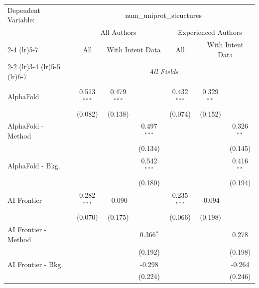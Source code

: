 \begingroup
\centering
\begin{tabular}{lcccccc}
   \tabularnewline \midrule \midrule
   Dependent Variable: & \multicolumn{6}{c}{num\_uniprot\_structures}\\
 & \multicolumn{3}{c}{All Authors} & \multicolumn{3}{c}{Experienced Authors} \\
\cmidrule(lr){2-4} \cmidrule(lr){5-7}
 & \multicolumn{1}{c}{All} & \multicolumn{2}{c}{With Intent Data} & \multicolumn{1}{c}{All} & \multicolumn{2}{c}{With Intent Data} \\
\cmidrule(lr){2-2} \cmidrule(lr){3-4} \cmidrule(lr){5-5} \cmidrule(lr){6-7}
 & \multicolumn{6}{c}{\textit{All Fields}} \\ \\
   AlphaFold            & 0.513$^{***}$ & 0.479$^{***}$ &               & 0.432$^{***}$ & 0.329$^{**}$ &   \\   
                        & (0.082)       & (0.138)       &               & (0.074)       & (0.152)      &   \\   
   AlphaFold - Method   &               &               & 0.497$^{***}$ &               &              & 0.326$^{**}$\\   
                        &               &               & (0.134)       &               &              & (0.145)\\   
   AlphaFold - Bkg.     &               &               & 0.542$^{***}$ &               &              & 0.416$^{**}$\\   
                        &               &               & (0.180)       &               &              & (0.194)\\   
   AI Frontier          & 0.282$^{***}$ & -0.090        &               & 0.235$^{***}$ & -0.094       &   \\   
                        & (0.070)       & (0.175)       &               & (0.066)       & (0.198)      &   \\   
   AI Frontier - Method &               &               & 0.366$^{*}$   &               &              & 0.278\\   
                        &               &               & (0.192)       &               &              & (0.198)\\   
   AI Frontier - Bkg.   &               &               & -0.298        &               &              & -0.264\\   
                        &               &               & (0.224)       &               &              & (0.246)\\   

\end{tabular}
